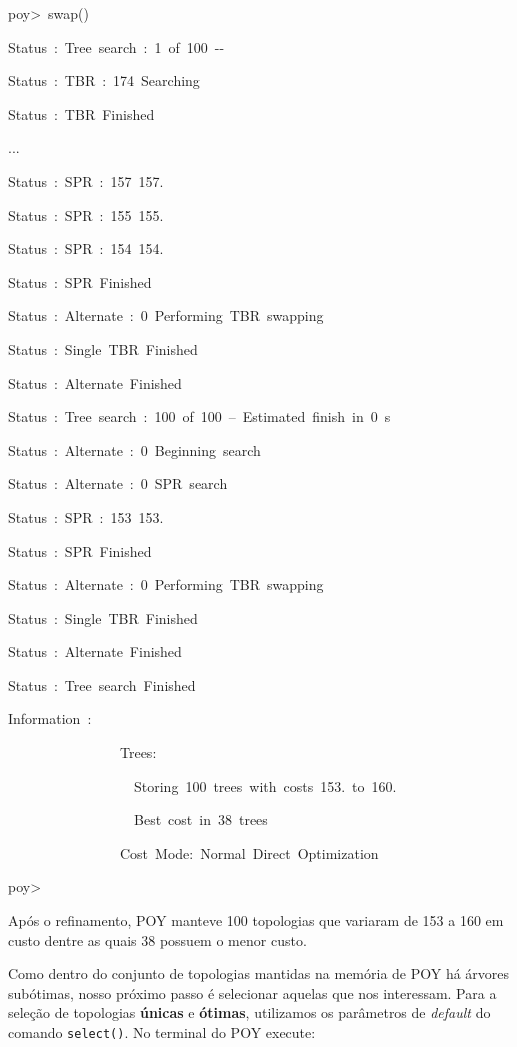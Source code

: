 \begin{refsection}
\scriptsize

poy>~swap()

Status~:~Tree~search~:~1~of~100~-{}-

Status~:~TBR~:~174~Searching

Status~:~TBR~Finished

...

Status~:~SPR~:~157~157.

Status~:~SPR~:~155~155.

Status~:~SPR~:~154~154.

Status~:~SPR~Finished

Status~:~Alternate~:~0~Performing~TBR~swapping

Status~:~Single~TBR~Finished

Status~:~Alternate~Finished

Status~:~Tree~search~:~100~of~100~--~Estimated~finish~in~0~s

Status~:~Alternate~:~0~Beginning~search

Status~:~Alternate~:~0~SPR~search

Status~:~SPR~:~153~153.

Status~:~SPR~Finished

Status~:~Alternate~:~0~Performing~TBR~swapping

Status~:~Single~TBR~Finished

Status~:~Alternate~Finished

Status~:~Tree~search~Finished

Information~:~

~~~~~~~~~~~~~~~~Trees:

~~~~~~~~~~~~~~~~~~Storing~100~trees~with~costs~153.~to~160.

~~~~~~~~~~~~~~~~~~Best~cost~in~38~trees~

~~~~~~~~~~~~~~~~Cost~Mode:~Normal~Direct~Optimization

poy>~

\normalsize

Após o refinamento, POY manteve 100 topologias que variaram de 153 a 160 em custo dentre as quais 38 possuem o menor custo.

Como dentro do conjunto de topologias mantidas na memória de POY há árvores subótimas, nosso próximo passo é selecionar aquelas que nos interessam. Para a seleção de topologias \textbf{únicas} e \textbf{ótimas}, utilizamos os parâmetros de \textit{default} do comando \texttt{select()}. No terminal do POY execute:\\

\\


\end{refsection}

